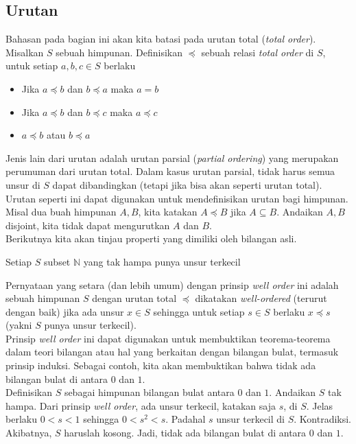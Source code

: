 	\subsection{Urutan}
	Bahasan pada bagian ini akan kita batasi pada urutan total (\textit{total order}). Misalkan $S$ sebuah himpunan. Definisikan $\preceq$ sebuah relasi \textit{total order} di $S$, untuk setiap $a,b,c \in S$ berlaku
	\begin{itemize}
		\item Jika $a \preceq b$ dan $b \preceq a$ maka $a = b$
		\item Jika $a \preceq b$ dan $b \preceq c$ maka $a \preceq c$
		\item $a \preceq b$ atau $b \preceq a$
	\end{itemize}
	Jenis lain dari urutan adalah urutan parsial (\textit{partial ordering}) yang merupakan perumuman dari urutan total. Dalam kasus urutan parsial, tidak harus semua unsur di $S$ dapat dibandingkan (tetapi jika bisa akan seperti urutan total). Urutan seperti ini dapat digunakan untuk mendefinisikan urutan bagi himpunan. Misal dua buah himpunan $A,B$, kita katakan $A \preceq B$ jika $A \subseteq B$. Andaikan $A,B$ disjoint, kita tidak dapat mengurutkan $A$ dan $B$.
	\\
	
	Berikutnya kita akan tinjau properti yang dimiliki oleh bilangan asli.
	
	\begin{inneraxiom}
		Setiap $S$ subset $\mathbb{N}$ yang tak hampa punya unsur terkecil
	\end{inneraxiom}
	Pernyataan yang setara (dan lebih umum) dengan prinsip \textit{well order} ini adalah sebuah himpunan $S$ dengan urutan total $\preceq$ dikatakan \textit{well-ordered} (terurut dengan baik) jika ada unsur $x \in S$ sehingga untuk setiap $s \in S$ berlaku $x \preceq s$ (yakni $S$ punya unsur terkecil).
	\\
	
	Prinsip \textit{well order} ini dapat digunakan untuk membuktikan teorema-teorema dalam teori bilangan atau hal yang berkaitan dengan bilangan bulat, termasuk prinsip induksi. Sebagai contoh, kita akan membuktikan bahwa tidak ada bilangan bulat di antara $0$ dan $1$.
	\\
	
	Definisikan $S$ sebagai himpunan bilangan bulat antara $0$ dan $1$. Andaikan $S$ tak hampa. Dari prinsip \textit{well order}, ada unsur terkecil, katakan saja $s$, di $S$. Jelas berlaku $0 < s < 1$ sehingga $0 < s^2 < s$. Padahal $s$ unsur terkecil di $S$. Kontradiksi. Akibatnya, $S$ haruslah kosong. Jadi, tidak ada bilangan bulat di antara $0$ dan $1$.
